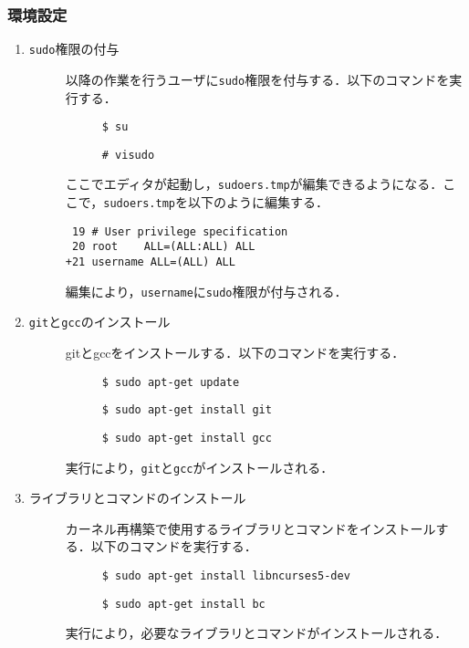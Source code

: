 \documentclass[12pt]{jsarticle}
\begin{document}
\subsubsection{環境設定}
\begin{enumerate}
\item \verb|sudo|権限の付与
  \begin{description}
  \item[] 以降の作業を行うユーザに\verb|sudo|権限を付与する．以下のコマンドを実行する．
    \begin{description}
    \item[] \verb|$ su|
    \item[] \verb|# visudo|
    \end{description}
  \item[] ここでエディタが起動し，\verb|sudoers.tmp|が編集できるようになる．ここで，\verb|sudoers.tmp|を以下のように編集する．
\begin{verbatim}
 19 # User privilege specification
 20 root    ALL=(ALL:ALL) ALL
+21 username ALL=(ALL) ALL
\end{verbatim}
    \item[] 編集により，\verb|username|に\verb|sudo|権限が付与される．
  \end{description}
\item \verb|git|と\verb|gcc|のインストール
  \begin{description}
  \item[] gitとgccをインストールする．以下のコマンドを実行する．
    \begin{description}
    \item[] \verb|$ sudo apt-get update|
    \item[] \verb|$ sudo apt-get install git|
    \item[] \verb|$ sudo apt-get install gcc|
    \end{description}
    \item[] 実行により，\verb|git|と\verb|gcc|がインストールされる．
  \end{description}
\item ライブラリとコマンドのインストール
  \begin{description}
  \item[] カーネル再構築で使用するライブラリとコマンドをインストールする．以下のコマンドを実行する．
    \begin{description}
    \item[] \verb|$ sudo apt-get install libncurses5-dev|
    \item[] \verb|$ sudo apt-get install bc |
    \end{description}
  \item[] 実行により，必要なライブラリとコマンドがインストールされる．
  \end{description}
\end{enumerate}
\end{document}
